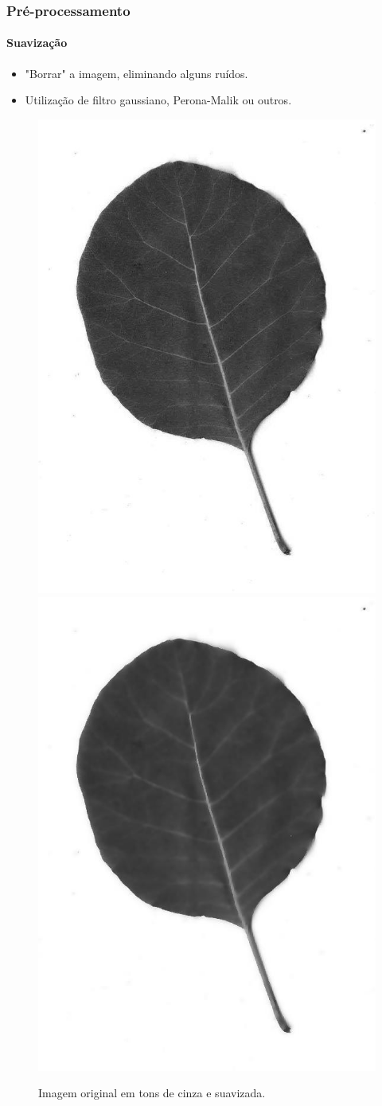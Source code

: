 \documentclass{beamer}
\begin{document}
    \begin{frame}
      \frametitle{Pré-processamento}
      \framesubtitle{Suavização}
    
        \begin{itemize}
          \item "Borrar" a imagem, eliminando alguns ruídos.
          \bigskip
          \item Utilização de filtro gaussiano, Perona-Malik ou outros.
        \end{itemize}
        
        \begin{figure}[hbt]
        \begin{center}
            \caption{Imagem original em tons de cinza e suavizada.}
            \includegraphics[width=0.3\linewidth]{img/leafs/01-gray.jpg}
            \quad
            \includegraphics[width=0.3\linewidth]{img/leafs/02-smooth.jpg}
        \end{center}
        \end{figure}
    \end{frame}
    
\end{document}
